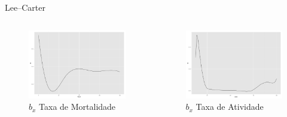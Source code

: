 \documentclass{beamer}
\begin{document}
\begin{frame}{Lee--Carter}
	\begin{columns}[c]
	\column{6cm}
	\begin{figure}
		\caption{$b_{x}$ Taxa de Mortalidade}
		\includegraphics[width=\textwidth]{Graphs/DR_LC_bx.pdf}
	\end{figure}
	\column{6cm}
	\begin{figure}
		\caption{$b_{x}$ Taxa de Atividade}
		\includegraphics[width=\textwidth]{Graphs/LFPR_LC_bx.pdf}
	\end{figure}
	\end{columns}  
\end{frame}
\end{document}
